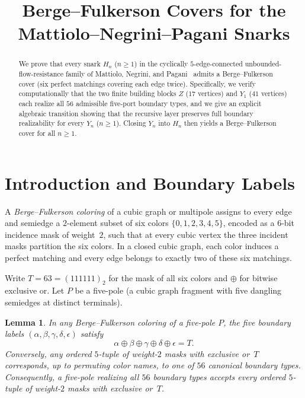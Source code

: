 \documentclass[11pt]{article}
\title{Berge--Fulkerson Covers for the Mattiolo--Negrini--Pagani Snarks}
\author{}
\date{}
\newtheorem{lemma}[theorem]{Lemma}
\begin{document}
\maketitle

\begin{abstract}
We prove that every snark $H_n$ ($n \ge 1$) in the cyclically $5$-edge-connected
unbounded-flow-resistance family of Mattiolo, Negrini, and Pagani~\cite{MNP} admits a
Berge--Fulkerson cover (six perfect matchings covering each edge twice). Specifically,
we verify computationally that the two finite building blocks $Z$ ($17$ vertices) and
$Y_1$ ($41$ vertices) each realize all $56$ admissible five-port boundary types, and we
give an explicit algebraic transition showing that the recursive layer preserves full
boundary realizability for every $Y_n$ ($n \ge 1$). Closing $Y_n$ into $H_n$ then yields
a Berge--Fulkerson cover for all $n \ge 1$.
\end{abstract}

\section{Introduction and Boundary Labels}

A \emph{Berge--Fulkerson coloring} of a cubic graph or multipole assigns to every edge
and semiedge a $2$-element subset of six colors $\{0,1,2,3,4,5\}$, encoded as a $6$-bit
incidence mask of weight~$2$, such that at every cubic vertex the three incident masks
partition the six colors. In a closed cubic graph, each color induces a perfect matching
and every edge belongs to exactly two of these six matchings.

Write $T = 63 = (111111)_2$ for the mask of all six colors and $\oplus$ for bitwise
exclusive or. Let $P$ be a five-pole (a cubic graph fragment with five dangling
semiedges at distinct terminals).

\begin{lemma}\label{lem:xor-admissible}
In any Berge--Fulkerson coloring of a five-pole $P$, the five boundary labels
$(\alpha,\beta,\gamma,\delta,\epsilon)$ satisfy
\[
  \alpha \oplus \beta \oplus \gamma \oplus \delta \oplus \epsilon = T.
\]
Conversely, any ordered $5$-tuple of weight-$2$ masks with exclusive or~$T$ corresponds,
up to permuting color names, to one of $56$ canonical boundary types. Consequently, a
five-pole realizing all $56$ boundary types accepts every ordered $5$-tuple of weight-$2$
masks with exclusive or~$T$.
\end{lemma}
\end{document}
